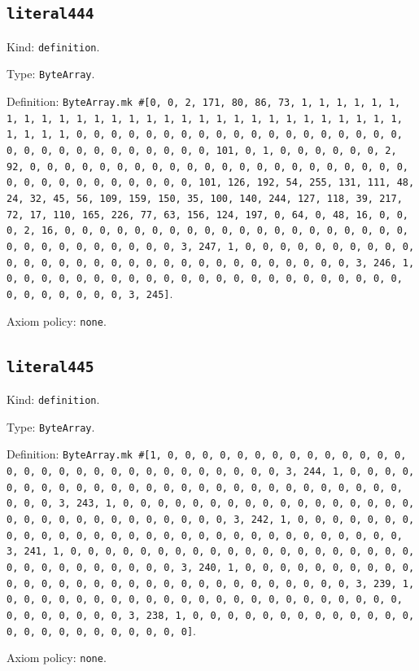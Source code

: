 \documentclass[11pt]{article}
\begin{document}
\subsection*{\texttt{literal444}}
\noindent Kind: \texttt{definition}.\par
\noindent Type: \texttt{ByteArray}.\par
\noindent Definition: \texttt{ByteArray.mk \#[0, 0, 2, 171, 80, 86, 73, 1, 1, 1, 1, 1, 1, 1, 1, 1, 1, 1, 1, 1, 1, 1, 1, 1, 1, 1, 1, 1, 1, 1, 1, 1, 1, 1, 1, 1, 1, 1, 1, 1, 0, 0, 0, 0, 0, 0, 0, 0, 0, 0, 0, 0, 0, 0, 0, 0, 0, 0, 0, 0, 0, 0, 0, 0, 0, 0, 0, 0, 0, 0, 0, 101, 0, 1, 0, 0, 0, 0, 0, 0, 2, 92, 0, 0, 0, 0, 0, 0, 0, 0, 0, 0, 0, 0, 0, 0, 0, 0, 0, 0, 0, 0, 0, 0, 0, 0, 0, 0, 0, 0, 0, 0, 0, 0, 0, 101, 126, 192, 54, 255, 131, 111, 48, 24, 32, 45, 56, 109, 159, 150, 35, 100, 140, 244, 127, 118, 39, 217, 72, 17, 110, 165, 226, 77, 63, 156, 124, 197, 0, 64, 0, 48, 16, 0, 0, 0, 2, 16, 0, 0, 0, 0, 0, 0, 0, 0, 0, 0, 0, 0, 0, 0, 0, 0, 0, 0, 0, 0, 0, 0, 0, 0, 0, 0, 0, 0, 0, 0, 3, 247, 1, 0, 0, 0, 0, 0, 0, 0, 0, 0, 0, 0, 0, 0, 0, 0, 0, 0, 0, 0, 0, 0, 0, 0, 0, 0, 0, 0, 0, 0, 0, 3, 246, 1, 0, 0, 0, 0, 0, 0, 0, 0, 0, 0, 0, 0, 0, 0, 0, 0, 0, 0, 0, 0, 0, 0, 0, 0, 0, 0, 0, 0, 0, 0, 3, 245]}.\par
\noindent Axiom policy: \texttt{none}.\par
\subsection*{\texttt{literal445}}
\noindent Kind: \texttt{definition}.\par
\noindent Type: \texttt{ByteArray}.\par
\noindent Definition: \texttt{ByteArray.mk \#[1, 0, 0, 0, 0, 0, 0, 0, 0, 0, 0, 0, 0, 0, 0, 0, 0, 0, 0, 0, 0, 0, 0, 0, 0, 0, 0, 0, 0, 0, 0, 3, 244, 1, 0, 0, 0, 0, 0, 0, 0, 0, 0, 0, 0, 0, 0, 0, 0, 0, 0, 0, 0, 0, 0, 0, 0, 0, 0, 0, 0, 0, 0, 0, 3, 243, 1, 0, 0, 0, 0, 0, 0, 0, 0, 0, 0, 0, 0, 0, 0, 0, 0, 0, 0, 0, 0, 0, 0, 0, 0, 0, 0, 0, 0, 0, 0, 3, 242, 1, 0, 0, 0, 0, 0, 0, 0, 0, 0, 0, 0, 0, 0, 0, 0, 0, 0, 0, 0, 0, 0, 0, 0, 0, 0, 0, 0, 0, 0, 0, 3, 241, 1, 0, 0, 0, 0, 0, 0, 0, 0, 0, 0, 0, 0, 0, 0, 0, 0, 0, 0, 0, 0, 0, 0, 0, 0, 0, 0, 0, 0, 0, 0, 3, 240, 1, 0, 0, 0, 0, 0, 0, 0, 0, 0, 0, 0, 0, 0, 0, 0, 0, 0, 0, 0, 0, 0, 0, 0, 0, 0, 0, 0, 0, 0, 0, 3, 239, 1, 0, 0, 0, 0, 0, 0, 0, 0, 0, 0, 0, 0, 0, 0, 0, 0, 0, 0, 0, 0, 0, 0, 0, 0, 0, 0, 0, 0, 0, 0, 3, 238, 1, 0, 0, 0, 0, 0, 0, 0, 0, 0, 0, 0, 0, 0, 0, 0, 0, 0, 0, 0, 0, 0, 0, 0, 0]}.\par
\noindent Axiom policy: \texttt{none}.\par
\end{document}
